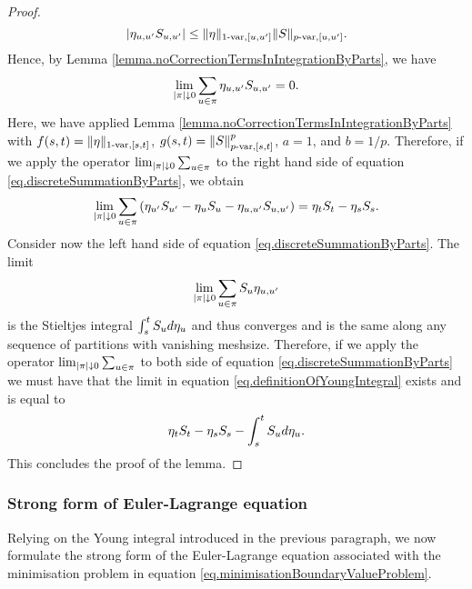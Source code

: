 \documentclass[10pt,a4paper]{article}
\begin{document}
\begin{appendices}
\begin{proof}
\begin{equation*}
\abs{\eta_{u,u\derivative}\fundamentalPrice_{u,u\derivative}}
 \leq \pvarNormInterval[\eta]{1}{[u,u\derivative]} \pvarNormInterval[\fundamentalPrice]{p}{[u,u\derivative]}.
\end{equation*}
Hence, by Lemma \ref{lemma.noCorrectionTermsInIntegrationByParts}, we have
\begin{equation*}
\lim_{\abs{\partition}\downarrow 0 }\sum_{u\in\partition} \eta_{u,u\derivative}\fundamentalPrice_{u,u\derivative} = 0. 
\end{equation*}
Here, we have applied Lemma \ref{lemma.noCorrectionTermsInIntegrationByParts} with $f(s,t) = \pvarNormInterval[\eta]{1}{[s,t]}$, $g(s,t) = \pvarNormInterval[\fundamentalPrice]{p}{[s,t]}^{p}$, $a=1$, and $b=1/p$. 
Therefore, if we apply the operator $\lim_{\abs{\partition}\downarrow 0 }\sum_{u\in\partition}$ to the right hand side of equation \eqref{eq.discreteSummationByParts}, we obtain 
\begin{equation*} \label{eq.meshsizeShrinkingOnRHSofIntegrationByParts}
\lim_{\abs{\partition}\downarrow 0 }\sum_{u\in\partition} \left(
 \eta_{u\derivative}\fundamentalPrice_{u\derivative} - \eta_{u}\fundamentalPrice_{u} - \eta_{u,u\derivative} \fundamentalPrice_{u,u\derivative}
 \right) = \eta_t\fundamentalPrice_t - \eta_s \fundamentalPrice_s. 
\end{equation*}
Consider now the left hand side of  equation \eqref{eq.discreteSummationByParts}. The limit 
\begin{equation*}
\lim_{\abs{\partition}\downarrow 0 } \sum_{u\in\partition} \fundamentalPrice_{u}\eta_{u,u\derivative}
\end{equation*}
is the  Stieltjes integral $\int_{s}^{t} \fundamentalPrice_u d\eta_u  $ and thus converges and is the same along any sequence of partitions with vanishing meshsize. Therefore, if we apply the operator $\lim_{\abs{\partition}\downarrow 0 }\sum_{u\in\partition}$ to both side of equation \eqref{eq.discreteSummationByParts} we must have that the limit in equation \eqref{eq.definitionOfYoungIntegral} exists and is equal to 
\begin{equation*}
\eta_t\fundamentalPrice_t - \eta_s \fundamentalPrice_s - \int_{s}^{t} \fundamentalPrice_u d\eta_u .
\end{equation*}
This concludes the proof of the lemma. 
\end{proof}

\subsubsection*{Strong form of Euler-Lagrange equation}
Relying on the Young integral introduced in the previous  paragraph, we now formulate the strong form of the Euler-Lagrange equation associated with the minimisation problem in equation \eqref{eq.minimisationBoundaryValueProblem}. 


\end{appendices}
\end{document}
